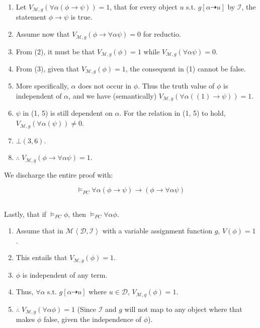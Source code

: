 \documentclass{article}
\begin{document}
    \begin{enumerate}
        \item Let $V_{\mathscr{M}, g}(\forall \alpha (\phi \rightarrow \psi)) = 1$, that for every object $u$ s.t. $g[\alpha \dashrightarrow u]$ by $\mathscr{I}$, the statement $\phi \rightarrow \psi$ is true.
        \item Assume now that $V_{\mathscr{M}, g}(\phi \rightarrow \forall \alpha \psi) = 0$ for reductio.
        \item From (2), it must be that $V_{\mathscr{M}, g}(\phi) = 1$ while $V_{\mathscr{M}, g}(\forall \alpha \psi) = 0$. 
        \item From (3), given that $V_{\mathscr{M}, g}(\phi) = 1$, the consequent in (1) cannot be false.
        \item More specifically, $\alpha$ does not occur in $\phi$. Thus the truth value of $\phi$ is independent of $\alpha$, and we have (semantically) $V_{\mathscr{M}, g}(\forall \alpha((1)\rightarrow \psi)) = 1$.
        \item $\psi$ in (1, 5) is still dependent on $\alpha$. For the relation in (1, 5) to hold, $V_{\mathscr{M}, g}(\forall\alpha(\psi)) \neq 0$.
        \item $\bot (3, 6)$.
        \item $\therefore \; V_{\mathscr{M}, g}(\phi \rightarrow \forall \alpha \psi) = 1$.
    \end{enumerate}

    We discharge the entire proof with: 

    $$\vDash_{PC} \forall \alpha (\phi \rightarrow \psi) \rightarrow (\phi \rightarrow \forall\alpha \psi)$$

    \subsection{}

    Lastly, that if $\vDash_{PC} \phi$, then $\vDash_{PC} \forall \alpha \phi$.

    \begin{enumerate}
        \item Assume that in $\mathscr{M} \left\langle \mathscr{D}, \mathscr{I} \right\rangle$ with a variable assignment function $g$, $V(\phi) = 1$.
        \item This entails that $V_{\mathscr{M}, g}(\phi) = 1$.
        \item $\phi$ is independent of any term.
        \item Thus, $\forall \alpha$ s.t. $g[\alpha \dashrightarrow u]$ where $u \in \mathscr{D}$, $V_{\mathscr{M}, g}(\phi) = 1$.
        \item $\therefore \; V_{\mathscr{M}, g}(\forall \alpha \phi) = 1$ (Since $\mathscr{I}$ and $g$ will not map to any object where that makes $\phi$ false, given the independence of $\phi$).
    \end{enumerate}
\end{document}
